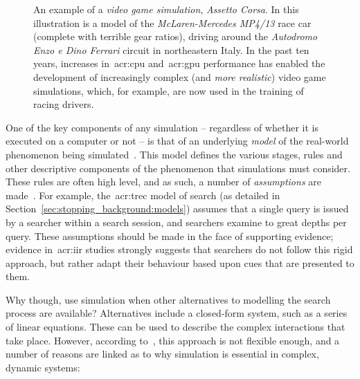 \begin{figure}[t!]
    \centering
    \caption[Racing Simulator Example]{An example of a \emph{video game simulation}, \emph{Assetto Corsa}. In this illustration is a model of the \emph{McLaren-Mercedes MP4/13} race car (complete with terrible gear ratios), driving around the \emph{Autodromo Enzo e Dino Ferrari} circuit in northeastern Italy. In the past ten years, increases in~\gls{acr:cpu} and~\gls{acr:gpu} performance has enabled the development of increasingly complex (and \emph{more realistic}) video game simulations, which, for example, are now used in the training of racing drivers.}
    \label{fig:ch1-mclaren}
\end{figure}

One of the key components of any simulation -- regardless of whether it is executed on a computer or not -- is that of an underlying \emph{model} of the real-world phenomenon being simulated~\citep{tocher1963art_of_simulation}. This model defines the various stages, rules and other descriptive components of the phenomenon that simulations must consider. These rules are often high level, and as such, a number of \emph{assumptions} are made~\citep{tocher1963art_of_simulation}. For example, the~\gls{acr:trec} model of search (as detailed in Section~\ref{sec:stopping_background:models}) assumes that a single query is issued by a searcher within a search session, and searchers examine to great depths per query. These assumptions should be made in the face of supporting evidence; evidence in~\gls{acr:iir} studies strongly suggests that searchers do not follow this rigid approach, but rather adapt their behaviour based upon cues that are presented to them.

Why though, use simulation when other alternatives to modelling the search process are available? Alternatives include a closed-form system, such as a series of linear equations. These can be used to describe the complex interactions that take place. However, according to~\cite{fishwick1995simulation}, this approach is not flexible enough, and a number of reasons are linked as to why simulation is essential in complex, dynamic systems:


